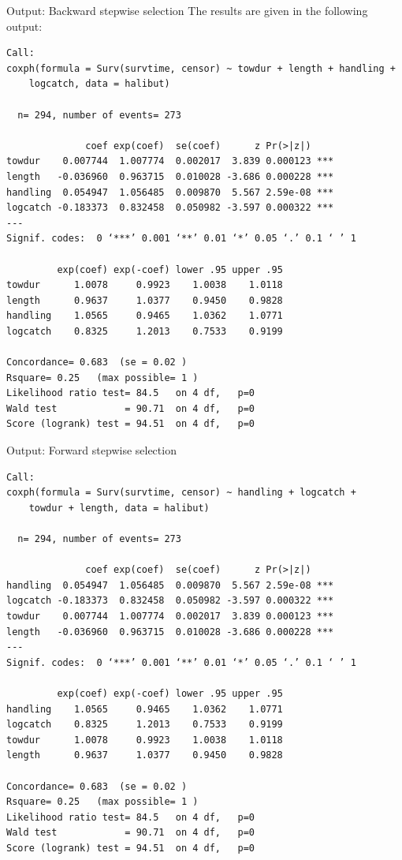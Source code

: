 \documentclass[envcountsect, 10pt, portrait, palatino]{beamer}
\begin{document}
\begin{frame}[fragile]{Output: Backward stepwise selection}
The results are given in the following output:

\scriptsize
\begin{verbatim}
Call:
coxph(formula = Surv(survtime, censor) ~ towdur + length + handling +
    logcatch, data = halibut)

  n= 294, number of events= 273

              coef exp(coef)  se(coef)      z Pr(>|z|)
towdur    0.007744  1.007774  0.002017  3.839 0.000123 ***
length   -0.036960  0.963715  0.010028 -3.686 0.000228 ***
handling  0.054947  1.056485  0.009870  5.567 2.59e-08 ***
logcatch -0.183373  0.832458  0.050982 -3.597 0.000322 ***
---
Signif. codes:  0 ‘***’ 0.001 ‘**’ 0.01 ‘*’ 0.05 ‘.’ 0.1 ‘ ’ 1

         exp(coef) exp(-coef) lower .95 upper .95
towdur      1.0078     0.9923    1.0038    1.0118
length      0.9637     1.0377    0.9450    0.9828
handling    1.0565     0.9465    1.0362    1.0771
logcatch    0.8325     1.2013    0.7533    0.9199

Concordance= 0.683  (se = 0.02 )
Rsquare= 0.25   (max possible= 1 )
Likelihood ratio test= 84.5   on 4 df,   p=0
Wald test            = 90.71  on 4 df,   p=0
Score (logrank) test = 94.51  on 4 df,   p=0
\end{verbatim}
\end{frame}
\begin{frame}[fragile]{Output: Forward stepwise selection}

\scriptsize
\begin{verbatim}
Call:
coxph(formula = Surv(survtime, censor) ~ handling + logcatch +
    towdur + length, data = halibut)

  n= 294, number of events= 273

              coef exp(coef)  se(coef)      z Pr(>|z|)
handling  0.054947  1.056485  0.009870  5.567 2.59e-08 ***
logcatch -0.183373  0.832458  0.050982 -3.597 0.000322 ***
towdur    0.007744  1.007774  0.002017  3.839 0.000123 ***
length   -0.036960  0.963715  0.010028 -3.686 0.000228 ***
---
Signif. codes:  0 ‘***’ 0.001 ‘**’ 0.01 ‘*’ 0.05 ‘.’ 0.1 ‘ ’ 1

         exp(coef) exp(-coef) lower .95 upper .95
handling    1.0565     0.9465    1.0362    1.0771
logcatch    0.8325     1.2013    0.7533    0.9199
towdur      1.0078     0.9923    1.0038    1.0118
length      0.9637     1.0377    0.9450    0.9828

Concordance= 0.683  (se = 0.02 )
Rsquare= 0.25   (max possible= 1 )
Likelihood ratio test= 84.5   on 4 df,   p=0
Wald test            = 90.71  on 4 df,   p=0
Score (logrank) test = 94.51  on 4 df,   p=0
\end{verbatim}
\end{frame}
\end{document}
